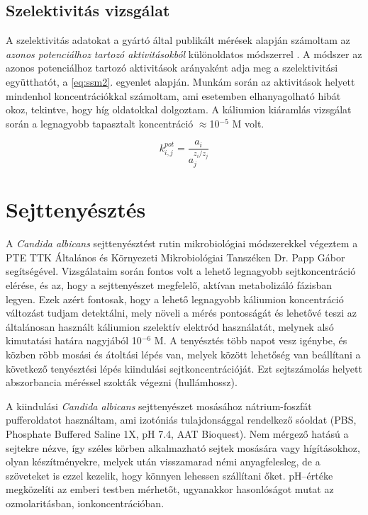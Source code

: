 \subsection{Szelektivitás vizsgálat}

A szelektivitás adatokat a gyártó által publikált mérések alapján \cite{thermo} számoltam az \emph{azonos potenciálhoz tartozó aktivitásokból} különoldatos módszerrel \cite{buck1994recommendations}. A módszer az azonos potenciálhoz tartozó aktivitások arányaként adja meg a szelektivitási együtthatót, a \ref{eq:ssm2}. egyenlet alapján. Munkám során az aktivitások helyett mindenhol koncentrációkkal számoltam, ami esetemben elhanyagolható hibát okoz, tekintve, hogy híg oldatokkal dolgoztam. A káliumion kiáramlás vizsgálat során a legnagyobb tapasztalt koncentráció $\approx$10$^{-5}$ M volt.

\begin{equation}
k_{i,j}^{pot}=\frac{a_i}{a_j^{z_i/z_j}}
\label{eq:ssm2}
\end{equation}

\section{Sejttenyésztés}

A \emph{Candida albicans} sejttenyésztést rutin mikrobiológiai módszerekkel végeztem a PTE TTK Általános és Környezeti Mikrobiológiai Tanszéken Dr. Papp Gábor segítségével. Vizsgálataim során fontos volt a lehető legnagyobb sejtkoncentráció elérése, és az, hogy a sejttenyészet megfelelő, aktívan metabolizáló fázisban legyen. Ezek azért fontosak, hogy a lehető legnagyobb káliumion koncentráció változást tudjam detektálni, mely növeli a mérés pontosságát és lehetővé teszi az általánosan használt káliumion szelektív elektród használatát, melynek alsó kimutatási határa nagyjából 10$^{-6}$ M. A tenyésztés több napot vesz igénybe, és közben röbb mosási és átoltási lépés van, melyek között lehetőség van beállítani a következő tenyésztési lépés kiindulási sejtkoncentrációját. Ezt sejtszámolás helyett abszorbancia méréssel szokták végezni (hullámhossz).

A kiindulási \emph{Candida albicans} sejttenyészet mosásához nátrium-foszfát pufferoldatot használtam, ami izotóniás tulajdonsággal rendelkező sóoldat (PBS, Phosphate Buffered Saline 1X, pH 7.4, AAT Bioquest). Nem mérgező hatású a sejtekre nézve, így széles körben alkalmazható sejtek mosására vagy hígításokhoz, olyan készítményekre, melyek után visszamarad némi anyagfelesleg, de a szöveteket is ezzel kezelik, hogy könnyen lehessen szállítani őket. pH--értéke megközelíti az emberi testben mérhetőt, ugyanakkor hasonlóságot mutat az ozmolaritásban, ionkoncentrációban. 


